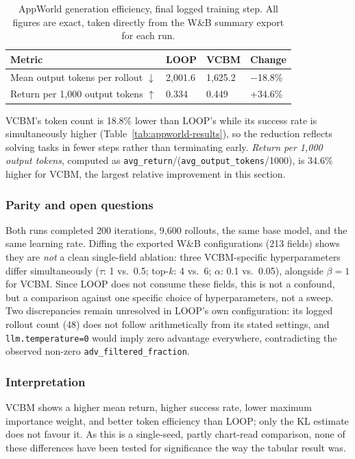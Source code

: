 \begin{table}[H]
  \centering
  \caption{AppWorld generation efficiency, final logged training step. All figures are exact, taken directly from the W\&B summary export for each run.}
  \label{tab:appworld-efficiency}
  \begin{tabularx}{\linewidth}{@{}l Z Z Z@{}}
    \toprule
    \textbf{Metric}                             & \textbf{LOOP} & \textbf{VCBM} & \textbf{Change} \\
    \midrule
    Mean output tokens per rollout $\downarrow$ & 2{,}001.6     & 1{,}625.2     & $-$18.8\%       \\
    Return per 1{,}000 output tokens $\uparrow$ & 0.334         & 0.449         & +34.6\%         \\
    \bottomrule
  \end{tabularx}
\end{table}

VCBM's token count is 18.8\% lower than LOOP's while its success rate is simultaneously higher (Table~\ref{tab:appworld-results}), so the reduction reflects solving tasks in fewer steps rather than terminating early. \emph{Return per 1{,}000 output tokens}, computed as \texttt{avg\_return}/(\texttt{avg\_output\_tokens}/1000), is 34.6\% higher for VCBM, the largest relative improvement in this section.

\subsubsection{Parity and open questions}
Both runs completed 200 iterations, 9,600 rollouts, the same base model, and the same learning rate. Diffing the exported W\&B configurations (213 fields) shows they are \emph{not} a clean single-field ablation: three VCBM-specific hyperparameters differ simultaneously ($\tau$: 1 vs.\ 0.5; top-$k$: 4 vs.\ 6; $\alpha$: 0.1 vs.\ 0.05), alongside $\beta=1$ for VCBM. Since LOOP does not consume these fields, this is not a confound, but a comparison against one specific choice of hyperparameters, not a sweep. Two discrepancies remain unresolved in LOOP's own configuration: its logged rollout count (48) does not follow arithmetically from its stated settings, and \texttt{llm.temperature=0} would imply zero advantage everywhere, contradicting the observed non-zero \texttt{adv\_filtered\_fraction}.

\subsubsection{Interpretation}
VCBM shows a higher mean return, higher success rate, lower maximum importance weight, and better token efficiency than LOOP; only the KL estimate does not favour it. As this is a single-seed, partly chart-read comparison, none of these differences have been tested for significance the way the tabular result was.

